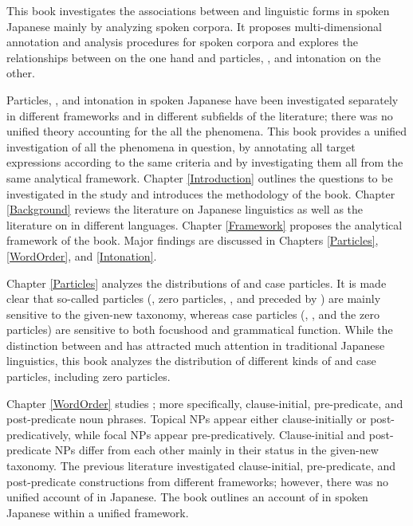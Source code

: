 \label{Abstract}
\begin{refsection}

This book investigates the associations between 
and linguistic forms in spoken Japanese
mainly by analyzing spoken corpora.
It proposes multi-dimensional annotation and analysis procedures for spoken corpora and
explores the relationships between  on the one hand
and particles, , and intonation on the other.

Particles, , and intonation in spoken Japanese have been investigated separately in different frameworks and in different subfields of the literature;
there was no unified theory accounting for the all the phenomena.
This book provides a unified investigation of all the phenomena in question, %
by annotating all target expressions according to the same criteria and
by investigating them all from the same analytical framework. %
Chapter \ref{Introduction} outlines the questions to be investigated in the study and introduces the methodology of the book.
Chapter \ref{Background} reviews the literature on Japanese linguistics
as well as the literature on  in different languages.
Chapter \ref{Framework} proposes the analytical framework of the book.
Major findings are discussed in Chapters \ref{Particles}, \ref{WordOrder}, and \ref{Intonation}.

Chapter \ref{Particles} analyzes the distributions of  and case particles.
It is made clear that so-called  particles 
(, zero particles, , and  preceded by ) are mainly sensitive to the given-new taxonomy,
whereas case particles (, , and the zero particles) are sensitive to both focushood and grammatical function.
While the distinction between  and  has attracted much attention in traditional Japanese linguistics,
this book analyzes the distribution of different kinds of  and case particles, including zero particles.%

Chapter \ref{WordOrder} studies ; more specifically, clause-initial, pre-predicate, and post-pred\-i\-cate noun phrases. %
Topical NPs appear either clause-initially or post-pred\-i\-cat\-ively,
while focal NPs appear pre-predicatively.
Clause-initial and post-predicate NPs differ from each other mainly in their status in the given-new taxonomy.
The previous literature investigated clause-initial, pre-predicate, and post-predicate constructions from different frameworks;
however, there was no unified account of  in Japanese.
The book outlines an account of  in spoken Japanese within a unified framework.


\end{refsection}
